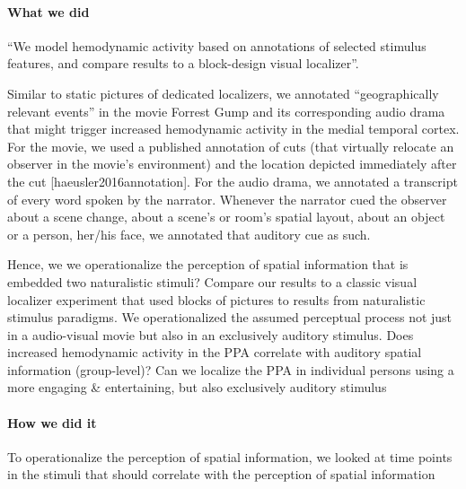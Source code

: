\paragraph{What we did}

``We model hemodynamic activity based on annotations of selected stimulus
features,
and compare results to a block-design visual localizer''.

Similar to static pictures of dedicated localizers, we annotated “geographically
relevant events” in the movie Forrest Gump and its corresponding audio drama
that might trigger increased hemodynamic activity in the medial temporal cortex.
%
For the movie, we used a published annotation of cuts (that virtually relocate
an observer in the movie’s environment) and the location depicted immediately
after the cut [haeusler2016annotation].
%
For the audio drama, we annotated a transcript of every word spoken by the
narrator. Whenever the narrator cued the observer about a scene change, about a
scene’s or room’s spatial layout, about an object or a person, her/his face, we
annotated that auditory cue as such.


%
Hence, we we operationalize the perception of spatial information that is
embedded two naturalistic stimuli?
%
Compare our results to a classic visual localizer experiment that used blocks of
pictures to results from naturalistic stimulus paradigms.
%
We operationalized the assumed perceptual process not just in a
audio-visual movie but also in an exclusively auditory stimulus.
Does increased hemodynamic activity in the PPA correlate with auditory spatial
information (group-level)?
Can we localize the PPA in individual persons using a more engaging \&
entertaining, but also exclusively auditory stimulus

\paragraph{How we did it}



To operationalize the perception of spatial information, we looked at time
points in the stimuli that should correlate with the perception of spatial
information

